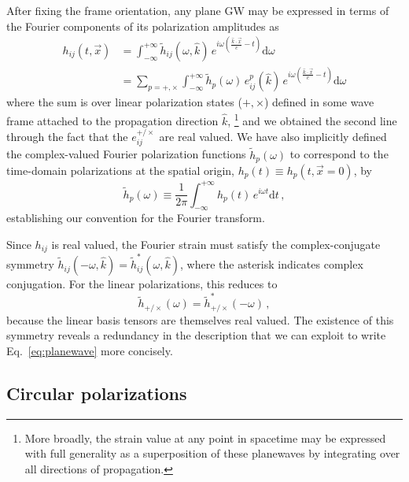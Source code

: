 \documentclass[aps,prd,twocolumn,superscriptaddress,preprintnumbers,floatfix,nofootinbib]{revtex4-2}
\newcommand{\beq}{\begin{equation}}
\newcommand{\eeq}{\end{equation}}
\newcommand{\infd}{\mathrm{d}}
\begin{document}
After fixing the frame orientation, any plane GW may be expressed in terms of the Fourier components of its polarization amplitudes as
\begin{align}
\label{eq:planewave}
h_{ij}(t,\vec{x}) &= \int_{-\infty}^{+\infty} \tilde{h}_{ij}(\omega, \hat{k})\, e^{i\omega \left(\frac{\hat{k}\cdot\vec{x}}{c}-t\right)} \infd \omega \nonumber \\
&= \sum_{p=+,\times} \int_{-\infty}^{+\infty} \tilde{h}_p(\omega)\, e^p_{ij}(\hat{k})\, e^{i\omega \left(\frac{\hat{k}\cdot\vec{x}}{c}-t\right)} \infd \omega
\end{align}
where the sum is over linear polarization states ($+,\times$) defined in some wave frame attached to the propagation direction $\hat{k}$,%
\footnote{More broadly, the strain value at any point in spacetime may be expressed with full generality as a superposition of these planewaves
by integrating over all directions of propagation.}
and we obtained the second line through the fact that the $e^{+/\times}_{ij}$ are real valued.
We have also implicitly defined the complex-valued Fourier polarization functions $\tilde{h}_p(\omega)$ to correspond to the time-domain polarizations at the spatial origin, $h_p(t) \equiv h_p(t, \vec{x}=0)$, by
\beq \label{eq:ft}
\tilde{h}_p(\omega) \equiv \frac{1}{2\pi} \int_{-\infty}^{+\infty} h_p(t)\, e^{i\omega t} \infd t \, ,
\eeq
establishing our convention for the Fourier transform.

Since $h_{ij}$ is real valued, the Fourier strain must  satisfy the complex-conjugate symmetry $\tilde{h}_{ij}(-\omega, \hat{k}) = \tilde{h}_{ij}^*(\omega,\hat{k})$, where the asterisk indicates complex conjugation.
For the linear polarizations, this reduces to
\beq \label{eq:sym_linear}
\tilde{h}_{+/\times}(\omega) = \tilde{h}_{+/\times}^*(-\omega)\, ,
\eeq
because the linear basis tensors are themselves real valued.
The existence of this symmetry reveals a redundancy in the description that we can exploit to write Eq.~\eqref{eq:planewave} more concisely.

\subsection{Circular polarizations}
\end{document}
